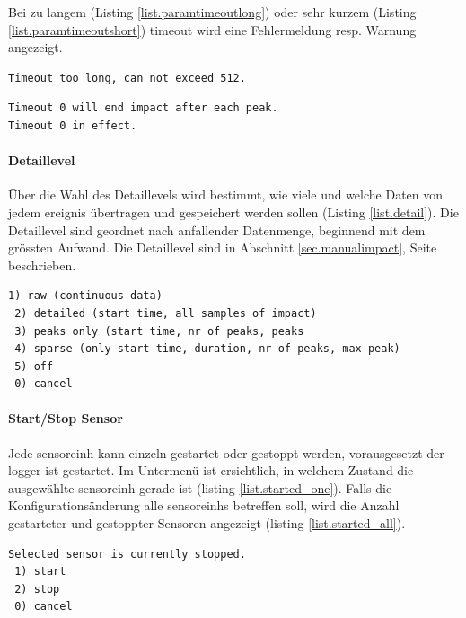 Bei zu langem (Listing \ref{list.paramtimeoutlong}) oder sehr kurzem (Listing \ref{list.paramtimeoutshort}) \gls{timeout} wird eine Fehlermeldung resp. Warnung angezeigt.

\begin{lstlisting}[caption=Fehlermeldung zu langer Timeout, label=list.paramtimeoutlong]
Timeout too long, can not exceed 512.
\end{lstlisting}

\begin{lstlisting}[caption=Warnung kurzer Timeout, label=list.paramtimeoutshort]
Timeout 0 will end impact after each peak.
Timeout 0 in effect.
\end{lstlisting}

\paragraph{Detaillevel} Über die Wahl des Detaillevels wird bestimmt, wie viele und welche Daten von jedem \gls{ereignis} übertragen und gespeichert werden sollen (Listing \ref{list.detail}). Die Detaillevel sind geordnet nach anfallender Datenmenge, beginnend mit dem grössten Aufwand. Die Detaillevel sind in Abschnitt \ref{sec.manualimpact}, Seite \pageref{sec.manualimpact} beschrieben.

\begin{lstlisting}[caption=Untermenü Detail-Level, label=list.detail]
 1) raw (continuous data)
 2) detailed (start time, all samples of impact)
 3) peaks only (start time, nr of peaks, peaks
 4) sparse (only start time, duration, nr of peaks, max peak)
 5) off
 0) cancel
\end{lstlisting}

\paragraph{Start/Stop Sensor} Jede \gls{sensoreinh} kann einzeln gestartet oder gestoppt werden, vorausgesetzt der \gls{logger} ist gestartet. Im Untermenü ist ersichtlich, in welchem Zustand die ausgewählte \gls{sensoreinh} gerade ist (listing \ref{list.started_one}). Falls die Konfigurationsänderung alle \glspl{sensoreinh} betreffen soll, wird die Anzahl gestarteter und gestoppter Sensoren angezeigt (listing \ref{list.started_all}).

\begin{lstlisting}[caption=Untermenü Start/Stop einzeln, label=list.started_one]
Selected sensor is currently stopped.
 1) start
 2) stop
 0) cancel
\end{lstlisting}

